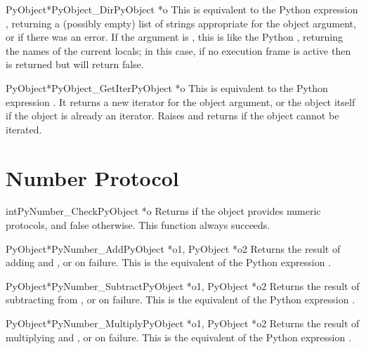 \begin{cfuncdesc}{PyObject*}{PyObject_Dir}{PyObject *o}
  This is equivalent to the Python expression ,
  returning a (possibly empty) list of strings appropriate for the
  object argument, or \NULL{} if there was an error.  If the argument
  is \NULL, this is like the Python , returning the names
  of the current locals; in this case, if no execution frame is active
  then \NULL{} is returned but  will
  return false.
\end{cfuncdesc}

\begin{cfuncdesc}{PyObject*}{PyObject_GetIter}{PyObject *o}
  This is equivalent to the Python expression .
  It returns a new iterator for the object argument, or the object 
  itself if the object is already an iterator.  Raises
   and returns \NULL{} if the object cannot be
  iterated.
\end{cfuncdesc}


\section{Number Protocol \label{number}}

\begin{cfuncdesc}{int}{PyNumber_Check}{PyObject *o}
  Returns  if the object  provides numeric protocols,
  and false otherwise.  This function always succeeds.
\end{cfuncdesc}


\begin{cfuncdesc}{PyObject*}{PyNumber_Add}{PyObject *o1, PyObject *o2}
  Returns the result of adding  and , or \NULL{} on
  failure.  This is the equivalent of the Python expression
  .
\end{cfuncdesc}


\begin{cfuncdesc}{PyObject*}{PyNumber_Subtract}{PyObject *o1, PyObject *o2}
  Returns the result of subtracting  from , or \NULL{}
  on failure.  This is the equivalent of the Python expression
  .
\end{cfuncdesc}


\begin{cfuncdesc}{PyObject*}{PyNumber_Multiply}{PyObject *o1, PyObject *o2}
  Returns the result of multiplying  and , or \NULL{}
  on failure.  This is the equivalent of the Python expression
  .
\end{cfuncdesc}


